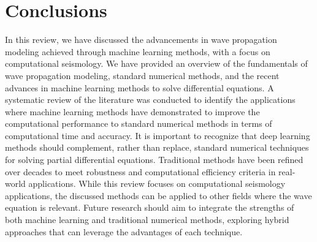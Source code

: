 \documentclass[11pt,twoside]{article}
\begin{document}


\section{Conclusions}\label{sec:conclusions}

In this review, we have discussed the advancements in wave propagation modeling achieved through machine learning
methods, with a focus on computational seismology. We have provided an overview of the fundamentals of wave
propagation modeling, standard numerical methods, and the recent advances in machine learning methods to solve
differential equations. A systematic review of the literature was conducted to identify the applications where
machine learning methods have demonstrated to improve the computational performance to standard numerical methods in terms
of computational time and accuracy. It is important to recognize that deep learning methods should complement, 
rather than replace, standard numerical techniques for solving partial differential equations. Traditional methods 
have been refined over decades to meet robustness and computational efficiency criteria in real-world applications. 
While this review focuses on computational seismology applications, the discussed methods can be applied to other 
fields where the wave equation is relevant. Future research should aim to integrate the strengths of both machine 
learning and traditional numerical methods, exploring hybrid approaches that can leverage the advantages of each 
technique.
\end{document}
